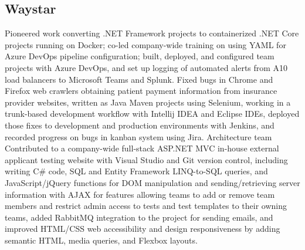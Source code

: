 \subsection{Waystar}
{
	Pioneered work converting .NET Framework projects to containerized .NET Core projects running on Docker; co-led company-wide training on using YAML for Azure DevOps pipeline configuration; built, deployed, and configured team projects with Azure DevOps, and set up logging of automated alerts from A10 load balancers to Microsoft Teams and Splunk.
}
{
	Fixed bugs in Chrome and Firefox web crawlers obtaining patient payment information from insurance provider websites, written as Java Maven projects using Selenium, working in a trunk-based development workflow with Intellij IDEA and Eclipse IDEs, deployed those fixes to development and production environments with Jenkins, and recorded progress on bugs in kanban system using Jira.
}
{Architecture team}
{}
{
	Contributed to a company-wide full-stack ASP.NET MVC in-house external applicant testing website with Visual Studio and Git version control, 
	including writing C\# code, 
	SQL and Entity Framework LINQ-to-SQL queries, 
	and JavaScript/jQuery functions for DOM manipulation and sending/retrieving server information with AJAX for features allowing teams to add or remove team members and restrict admin access to tests and test templates to their owning teams, 
	added RabbitMQ integration to the project for sending emails,
	and improved HTML/CSS web accessibility and design responsiveness by adding semantic HTML, 
	media queries, 
	and Flexbox layouts.
}
